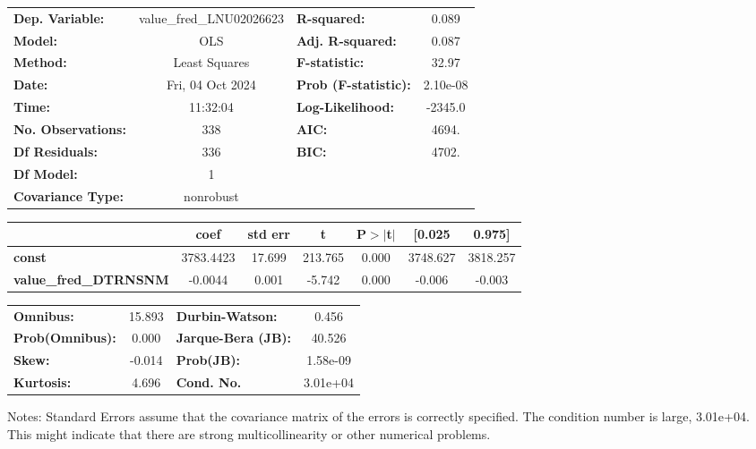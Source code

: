 \begin{center}
\begin{tabular}{lclc}
\toprule
\textbf{Dep. Variable:}       & value\_fred\_LNU02026623 & \textbf{  R-squared:         } &     0.089   \\
\textbf{Model:}               &           OLS            & \textbf{  Adj. R-squared:    } &     0.087   \\
\textbf{Method:}              &      Least Squares       & \textbf{  F-statistic:       } &     32.97   \\
\textbf{Date:}                &     Fri, 04 Oct 2024     & \textbf{  Prob (F-statistic):} &  2.10e-08   \\
\textbf{Time:}                &         11:32:04         & \textbf{  Log-Likelihood:    } &   -2345.0   \\
\textbf{No. Observations:}    &             338          & \textbf{  AIC:               } &     4694.   \\
\textbf{Df Residuals:}        &             336          & \textbf{  BIC:               } &     4702.   \\
\textbf{Df Model:}            &               1          & \textbf{                     } &             \\
\textbf{Covariance Type:}     &        nonrobust         & \textbf{                     } &             \\
\bottomrule
\end{tabular}
\begin{tabular}{lcccccc}
                              & \textbf{coef} & \textbf{std err} & \textbf{t} & \textbf{P$> |$t$|$} & \textbf{[0.025} & \textbf{0.975]}  \\
\midrule
\textbf{const}                &    3783.4423  &       17.699     &   213.765  &         0.000        &     3748.627    &     3818.257     \\
\textbf{value\_fred\_DTRNSNM} &      -0.0044  &        0.001     &    -5.742  &         0.000        &       -0.006    &       -0.003     \\
\bottomrule
\end{tabular}
\begin{tabular}{lclc}
\textbf{Omnibus:}       & 15.893 & \textbf{  Durbin-Watson:     } &    0.456  \\
\textbf{Prob(Omnibus):} &  0.000 & \textbf{  Jarque-Bera (JB):  } &   40.526  \\
\textbf{Skew:}          & -0.014 & \textbf{  Prob(JB):          } & 1.58e-09  \\
\textbf{Kurtosis:}      &  4.696 & \textbf{  Cond. No.          } & 3.01e+04  \\
\bottomrule
\end{tabular}
\end{center}

Notes: \newline
 [1] Standard Errors assume that the covariance matrix of the errors is correctly specified. \newline
 [2] The condition number is large, 3.01e+04. This might indicate that there are \newline
 strong multicollinearity or other numerical problems.